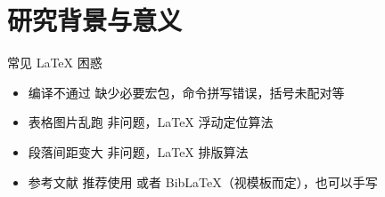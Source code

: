 

\section{研究背景与意义}

\begin{frame}{常见 \LaTeX{} 困惑}
  \begin{itemize}
    \item \alert{编译不通过} 缺少必要宏包，命令拼写错误，括号未配对等
    \item \alert{表格图片乱跑} 非问题，\LaTeX{} 浮动定位算法
    \item \alert{段落间距变大} 非问题，\LaTeX{} 排版算法
    \item \alert{参考文献} 推荐使用 \BibTeX{} 或者 Bib\LaTeX{}（视模板而定），也可以手写 
  \end{itemize}
\end{frame}
